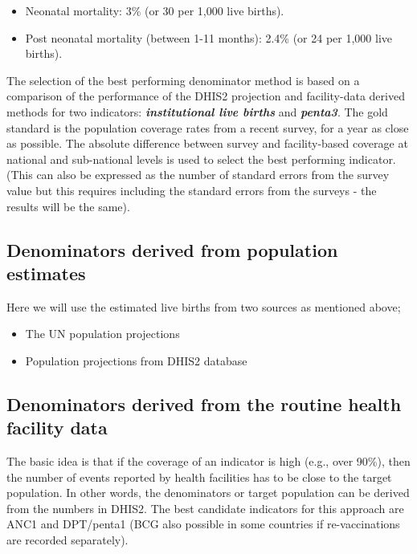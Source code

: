 \documentclass[
  english,
  letterpaper,
  DIV=11,
  numbers=noendperiod]{scrreprt}
\providecommand{\tightlist}{%
  \setlength{\itemsep}{0pt}\setlength{\parskip}{0pt}}
\begin{document}
\begin{itemize}
\tightlist
\item
  Neonatal mortality: 3\% (or 30 per 1,000 live births).
\item
  Post neonatal mortality (between 1-11 months): 2.4\% (or 24 per 1,000
  live births).
\end{itemize}

The selection of the best performing denominator method is based on a
comparison of the performance of the DHIS2 projection and facility-data
derived methods for two indicators: \textbf{\emph{institutional live
births}} and \textbf{\emph{penta3}}. The gold standard is the population
coverage rates from a recent survey, for a year as close as possible.
The absolute difference between survey and facility-based coverage at
national and sub-national levels is used to select the best performing
indicator. (This can also be expressed as the number of standard errors
from the survey value but this requires including the standard errors
from the surveys - the results will be the same).

\subsection{Denominators derived from population
estimates}\label{denominators-derived-from-population-estimates}

Here we will use the estimated live births from two sources as mentioned
above;

\begin{itemize}
\item
  The UN population projections
\item
  Population projections from DHIS2 database
\end{itemize}

\subsection{Denominators derived from the routine health facility
data}\label{denominators-derived-from-the-routine-health-facility-data}

The basic idea is that if the coverage of an indicator is high (e.g.,
over 90\%), then the number of events reported by health facilities has
to be close to the target population. In other words, the denominators
or target population can be derived from the numbers in DHIS2. The best
candidate indicators for this approach are ANC1 and DPT/penta1 (BCG also
possible in some countries if re-vaccinations are recorded separately).
\end{document}
